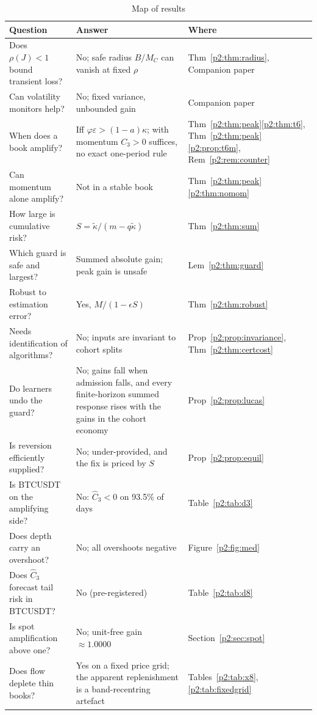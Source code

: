 {\footnotesize\begin{longtable}{p{}p{}p{}}
\caption{Map of results}\label{p2:tab:map}\\
\toprule
Question & Answer & Where\\
\midrule
Does $\rho(J)<1$ bound transient loss? & No; safe radius $B/M_C$ can vanish at fixed $\rho$ & Thm~\ref{p2:thm:radius}, Companion paper\\
Can volatility monitors help? & No; fixed variance, unbounded gain & Companion paper\\
When does a book amplify? & Iff $\varphi\varepsilon>(1-a)\kappa$; with momentum $C_3>0$ suffices, no exact one-period rule & Thm~\ref{p2:thm:peak}\ref{p2:thm:t6}, Thm~\ref{p2:thm:peak}\ref{p2:prop:t6m}, Rem~\ref{p2:rem:counter}\\
Can momentum alone amplify? & Not in a stable book & Thm~\ref{p2:thm:peak}\ref{p2:thm:nomom}\\
How large is cumulative risk? & $S=\tilde\kappa/(m-q\tilde\kappa)$ & Thm~\ref{p2:thm:sum}\\
Which guard is safe and largest? & Summed absolute gain; peak gain is unsafe & Lem~\ref{p2:thm:guard}\\
Robust to estimation error? & Yes, $M/(1-\epsilon S)$ & Thm~\ref{p2:thm:robust}\\
Needs identification of algorithms? & No; inputs are invariant to cohort splits & Prop~\ref{p2:prop:invariance}, Thm~\ref{p2:thm:certcost}\\
Do learners undo the guard? & No; gains fall when admission falls, and every finite-horizon summed response rises with the gains in the cohort economy & Prop~\ref{p2:prop:lucas}\\
Is reversion efficiently supplied? & No; under-provided, and the fix is priced by $S$ & Prop~\ref{p2:prop:equil}\\
Is BTCUSDT on the amplifying side? & No: $\hat C_3<0$ on 93.5\% of days & Table~\ref{p2:tab:d3}\\
Does depth carry an overshoot? & No; all overshoots negative & Figure~\ref{p2:fig:med}\\
Does $\hat C_3$ forecast tail risk in BTCUSDT? & No (pre-registered) & Table~\ref{p2:tab:d8}\\
Is spot amplification above one? & No; unit-free gain $\approx1.0000$ & Section~\ref{p2:sec:spot}\\
Does flow deplete thin books? & Yes on a fixed price grid; the apparent replenishment is a band-recentring artefact & Tables~\ref{p2:tab:x8}, \ref{p2:tab:fixedgrid}\\

\end{longtable}}
